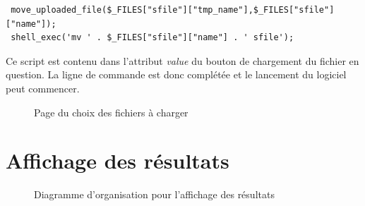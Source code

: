 \begin{DDbox}{\linewidth}
\begin{lstlisting}
 move_uploaded_file($_FILES["sfile"]["tmp_name"],$_FILES["sfile"]["name"]);
 shell_exec('mv ' . $_FILES["sfile"]["name"] . ' sfile');
\end{lstlisting}
\end{DDbox}

Ce script est contenu dans l'attribut \textit{value} du bouton de chargement du fichier en question. La ligne de commande est donc complétée et le lancement du logiciel peut commencer. 

\begin{figure}[!ht]
	\begin{center}
		\caption{Page du choix des fichiers à charger}
  		\label{choix}
  	\end{center}	
\end{figure}

\section{Affichage des résultats}

\begin{figure}[!ht]
	\begin{center}
		\caption{Diagramme d'organisation pour l'affichage des résultats}
  		\label{DiagResults}
  	\end{center}	
\end{figure}

